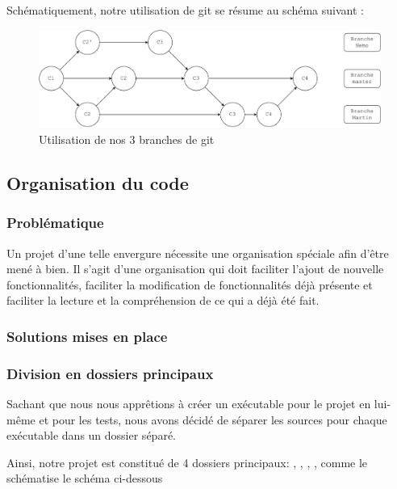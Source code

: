 Schématiquement, notre utilisation de git se résume au schéma suivant :

\begin{center}
    \begin{figure}[H]
        \centering
        \includegraphics[width=\textwidth]{img/git_branch.pdf}
        \caption{Utilisation de nos 3 branches de git}
        \label{fig:git_branch}
    \end{figure}
\end{center}


\subsection{Organisation du code}


\subsubsection*{Problématique}


    Un projet d'une telle envergure nécessite une organisation spéciale afin d'être mené à 
bien. Il s'agit d'une organisation qui doit faciliter l'ajout de nouvelle fonctionnalités,
faciliter la modification de fonctionnalités déjà présente et faciliter la lecture et la 
compréhension de ce qui a déjà été fait.




\subsubsection*{Solutions mises en place}


\subsubsection*{Division en dossiers principaux}


    Sachant que nous nous apprêtions à créer un exécutable pour le projet en lui-même et pour les
tests, nous avons décidé de séparer les sources pour chaque exécutable dans un dossier séparé.


    Ainsi, notre projet est constitué de 4 dossiers principaux: , , 
, , comme le schématise le schéma ci-dessous


